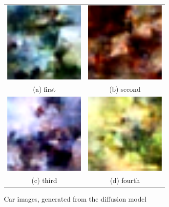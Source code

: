 \documentclass[conference]{IEEEtran}
\begin{document}
  \begin{figure}
    \begin{tabular}{cc}
      \includegraphics[width=40mm]{./images/generated-imgs-cosine/car/0102.png} 
  &   \includegraphics[width=40mm]{./images/generated-imgs-cosine/car/0103.png} 
  \\
    (a) first 
    & (b) second \\[6pt]
       \includegraphics[width=40mm]{./images/generated-imgs-cosine/car/0104.png} 
    &  \includegraphics[width=40mm]{./images/generated-imgs-cosine/car/0105.png} 
  \\
    (c) third & (d) fourth \\[6pt]
    \end{tabular}
    \caption{Car images, generated from the diffusion model}
    \end{figure}
\end{document}
